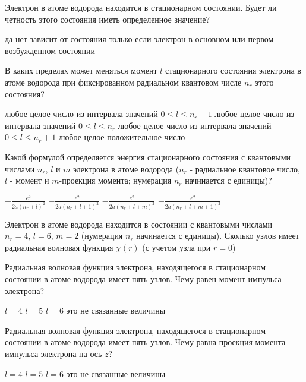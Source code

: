 \documentclass[11pt,a4paper]{exam}
\begin{document}
\begin{questions}
\question  Электрон в атоме водорода находится в стационарном состоянии. Будет ли четность этого состояния иметь определенное значение?
\begin{choices}
\choice да             
\choice нет
\choice зависит от состояния    
\choice только если электрон в основном или первом возбужденном состоянии
\end{choices}

\question  В каких пределах может меняться момент $l$ стационарного состояния электрона в атоме водорода  при фиксированном радиальном квантовом числе ${n_r}$ этого состояния?
\begin{choices}
\choice любое целое число из интервала значений $0 \le l \le {n_r} - 1$
\choice любое целое число из интервала значений $0 \le l \le {n_r}$
\choice любое целое число из интервала значений $0 \le l \le {n_r} + 1$
\choice любое целое положительное число
\end{choices}

\question Какой формулой определяется энергия стационарного состояния с квантовыми числами ${n_r}$, $l$ и $m$ электрона в атоме водорода (${n_r}$ - радиальное квантовое число, $l$ - момент и $m$-проекция момента; нумерация ${n_r}$ начинается с единицы)?
\begin{choices}
\choice $ - \frac{{{e^2}}}{{2a{{({n_r} + l)}^2}}}$      
\choice $ - \frac{{{e^2}}}{{2a{{({n_r} + l + 1)}^2}}}$     
\choice $ - \frac{{{e^2}}}{{2a{{({n_r} + l + m)}^2}}}$     
\choice $ - \frac{{{e^2}}}{{2a{{({n_r} + l + m + 1)}^2}}}$
\end{choices}

\question  Электрон в атоме водорода находится в состоянии с квантовыми числами ${n_r} = 4,\,l = 6,\,m = 2$ (нумерация ${n_r}$ начинается с единицы). Сколько узлов имеет радиальная волновая функция $\chi (r)$ (с учетом узла при $r = 0$)
\begin{choices}
\end{choices}

\question  Радиальная волновая функция электрона, находящегося в стационарном состоянии в атоме водорода имеет пять узлов. Чему равен момент импульса электрона?
\begin{choices}
\choice $l = 4$     
\choice $l = 5$     
\choice $l = 6$     
\choice это не связанные величины
\end{choices}

\question Радиальная волновая функция электрона, находящегося в стационарном состоянии в атоме водорода имеет пять узлов. Чему равна проекция момента импульса электрона на ось $z$?
\begin{choices}
\choice $l = 4$     
\choice $l = 5$     
\choice $l = 6$     
\choice это не связанные величины
\end{choices}


\end{questions}
\end{document}
